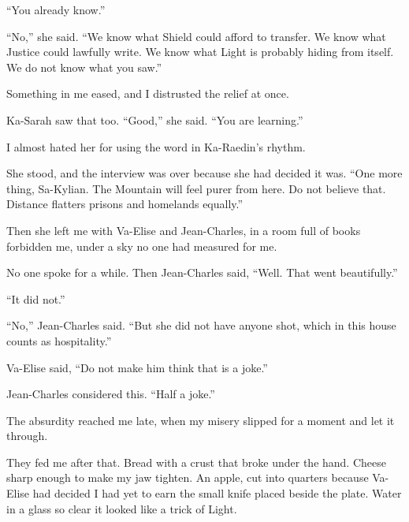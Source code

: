 ``You already know.''\par

``No,'' she said. ``We know what Shield could afford to transfer. We know what Justice could lawfully write. We know what Light is probably hiding from itself. We do not know what you saw.''\par

Something in me eased, and I distrusted the relief at once.\par

Ka-Sarah saw that too. ``Good,'' she said. ``You are learning.''\par

I almost hated her for using the word in Ka-Raedin's rhythm.\par

She stood, and the interview was over because she had decided it was. ``One more thing, Sa-Kylian. The Mountain will feel purer from here. Do not believe that. Distance flatters prisons and homelands equally.''\par

Then she left me with Va-Elise and Jean-Charles, in a room full of books forbidden me, under a sky no one had measured for me.\par

No one spoke for a while. Then Jean-Charles said, ``Well. That went beautifully.''\par

``It did not.''\par

``No,'' Jean-Charles said. ``But she did not have anyone shot, which in this house counts as hospitality.''\par

Va-Elise said, ``Do not make him think that is a joke.''\par

Jean-Charles considered this. ``Half a joke.''\par

The absurdity reached me late, when my misery slipped for a moment and let it through.\par

They fed me after that. Bread with a crust that broke under the hand. Cheese sharp enough to make my jaw tighten. An apple, cut into quarters because Va-Elise had decided I had yet to earn the small knife placed beside the plate. Water in a glass so clear it looked like a trick of Light.\par

